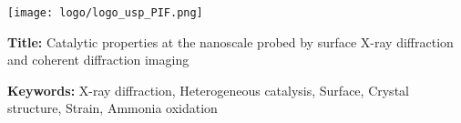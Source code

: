 \newpage
\thispagestyle{empty}

\lhead{}
\rhead{}
\rfoot{}
\cfoot{}
\lfoot{}

\noindent
\texttt{[image: logo/logo\_usp\_PIF.png]}
\vspace{0.5cm}

\small

\begin{mdframed}[linecolor=Prune,linewidth=1]

\textbf{Title:} Catalytic properties at the nanoscale probed by surface X-ray diffraction and coherent diffraction imaging

\noindent \textbf{Keywords:} X-ray diffraction, Heterogeneous catalysis, Surface, Crystal structure, Strain, Ammonia oxidation


\end{mdframed}
